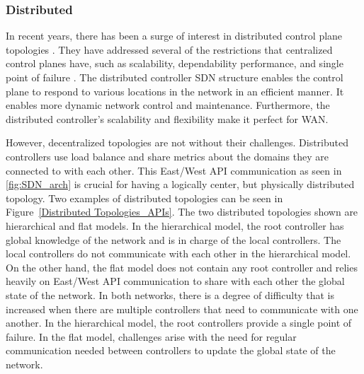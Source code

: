 \documentclass[conference]{IEEEtran}
\begin{document}
\subsubsection{Distributed} \label{Distributed SDN} In recent years, there has been a surge of interest in distributed control plane topologies \cite{kreutz2014software}\cite{bannour2017distributed}. They have addressed several of the restrictions that centralized control planes have, such as scalability, dependability performance, and single point of failure \cite{ahmad2021scalability}. The distributed controller SDN structure enables the control plane to respond to various locations in the network in an efficient manner. It enables more dynamic network control and maintenance. Furthermore, the distributed controller's scalability and flexibility make it perfect for WAN.

However, decentralized topologies are not without their challenges. Distributed controllers use load balance and share metrics about the domains they are connected to with each other. This East/West API communication as seen in \cref{fig:SDN_arch} is crucial for having a logically center, but physically distributed topology. Two examples of distributed topologies can be seen in Figure~\ref{Distributed Topologies_APIs}. The two distributed topologies shown are hierarchical and flat models. In the hierarchical model, the root controller has global knowledge of the network and is in charge of the local controllers. The local controllers do not communicate with each other in the hierarchical model. On the other hand, the flat model does not contain any root controller and relies heavily on East/West API communication to share with each other the global state of the network. In both networks, there is a degree of difficulty that is increased when there are multiple controllers that need to communicate with one another. In the hierarchical model, the root controllers provide  a single point of failure. In the flat model, challenges arise with the need for regular communication needed between controllers to update the global state of the network\cite{chahlaoui2020taxonomy, ahmad2021scalability}.


\end{document}
